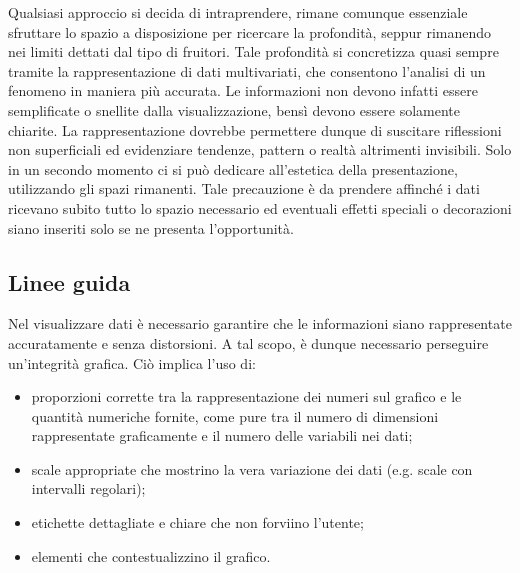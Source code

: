 Qualsiasi approccio si decida di intraprendere, rimane comunque essenziale sfruttare lo spazio a disposizione per ricercare la profondità, seppur rimanendo nei limiti dettati dal tipo di fruitori.
Tale profondità si concretizza quasi sempre tramite la rappresentazione di dati multivariati, che consentono l'analisi di un fenomeno in maniera più accurata. %
Le informazioni non devono infatti essere semplificate o snellite dalla visualizzazione, bensì devono essere solamente chiarite. La rappresentazione dovrebbe permettere dunque di suscitare riflessioni non superficiali ed evidenziare tendenze, pattern 
o realtà altrimenti invisibili. 
Solo in un secondo momento ci si può dedicare all'estetica della presentazione, utilizzando gli spazi rimanenti. Tale precauzione è da prendere affinché i dati ricevano subito tutto lo spazio necessario ed eventuali
effetti speciali o decorazioni siano inseriti solo se ne presenta l'opportunità.


\subsection{Linee guida}
Nel visualizzare dati è necessario garantire che le informazioni siano rappresentate accuratamente e senza distorsioni.
A tal scopo, è dunque necessario perseguire un'integrità grafica. Ciò implica l'uso di:
\begin{itemize}
    \item proporzioni corrette tra la rappresentazione dei numeri sul grafico e le quantità numeriche fornite, come pure tra il 
    numero di dimensioni rappresentate graficamente e il numero delle variabili nei dati;
    \item scale appropriate che mostrino la vera variazione dei dati (e.g. scale con intervalli regolari);
    \item etichette dettagliate e chiare che non forviino l'utente;
    \item elementi che contestualizzino il grafico.
\end{itemize}

